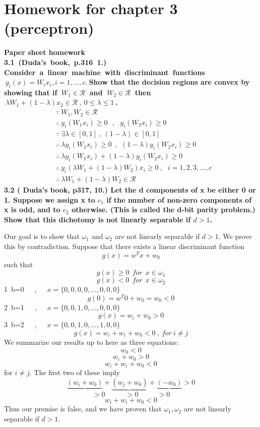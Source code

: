 \section{Homework for chapter 3 (perceptron)}
\noindent \textbf{Paper sheet homework\\
3.1~(Duda’s~book,~p.316~1.) Consider~a~linear~machine~with~discriminant~functions~$~g_i(x)=W_ix_i,i=
1,...,c.~$Show that the decision regions are convex by showing that if $~W_1 \in \mathcal{R}~$ and
$~W_2 \in \mathcal{R}~$ then $~\lambda W_1 + (1 - \lambda)x_2 \in  \mathcal{R} ~,~0 \leq \lambda \leq 1~$.}
\begin{align}
&\because~ W_1,W_2 \in \mathcal{R} \nonumber\\
&\therefore~ y_i(W_1x_i)\geq 0~~~,~~~y_i(W_2x_i)\geq 0 \nonumber\\
&\because~ \exists \lambda \in [0,1]~,~(1-\lambda)\in [0,1] \nonumber\\
&\therefore~ \lambda y_i(W_1x_i) \geq 0~~,~~(1-\lambda) y_i(W_2x_i) \geq 0 \nonumber\\
&\therefore~ \lambda y_i(W_1x_i)+(1-\lambda) y_i(W_2x_i) \geq 0 \nonumber\\
&\therefore~ y_i(\lambda W_1+(1-\lambda)W_2)x_i\geq 0~,~~~i = 1,2,3,...,c \nonumber \\
&\therefore~ \lambda W_1+(1-\lambda)W_2 \in \mathcal{R} \nonumber
\end{align}
\textbf{3.2 ( Duda’s book, p317, 10.) Let the d components of x be either 0 or 1. Suppose we assign x to
$c_1$ if the number of non-zero components of x is odd, and to
$c_2$ otherwise. (This is called the d-bit parity
problem.) Show that this dichotomy is not linearly separable if $d > 1$.\\}

\noindent Our goal is to show that $\omega_1$ and $\omega_2$ are not linearly separable if $d > 1$. We prove
this by contradiction. Suppose that there exists a linear discriminant function$$g(x)=w^Tx+w_0$$
such that$$g(x)\geq 0~~for~~x\in \omega_1 $$$$g(x)< 0~~for~~x\in \omega_2$$
\textcircled{\footnotesize{1}}~b=0~~~,~~~$x=\{0,0,0,0,...,0,0,0\}$~~~$$g(0) = w^T 0 + w_0 = w_0 < 0$$
\textcircled{\footnotesize{2}}~b=1~~~,~~~$x=\{0,0,1,0,...,0,0,0\}$~~~$$g(x) = w_i + w_0 > 0$$
\textcircled{\footnotesize{3}}~b=2~~~,~~~$x=\{0,0,1,0,...,1,0,0\}$~~~$$g(x) = w_i + w_i +  w_0 < 0~,~for ~i \neq j$$
We summarize our results up to here as three equations:
$$ w_0 < 0$$
$$ w_i + w_0 > 0$$
$$ w_i + w_i +  w_0 < 0$$
for $i \neq j$. The first two of these imply
$$\underbrace{(w_i + w_0)} + \underbrace{(w_j + w_0)} + \underbrace{(-w_0)} > 0$$
$$>0~~~~~~~~~~~~~>0~~~~~~~~~~~~>0$$
$$ w_i + w_i +  w_0 < 0$$
 Thus our premise is false, and we have
proven that $\omega_1 ,\omega_2$ are not linearly separable if $d>1$.

